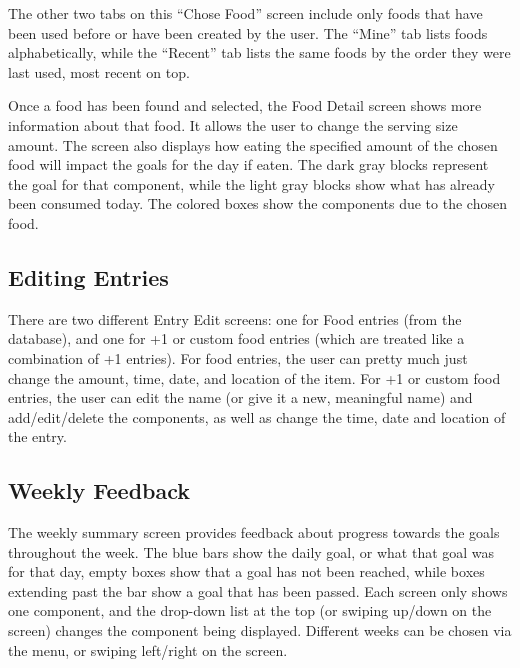 The other two tabs on this ``Chose Food'' screen include only foods that have been used before or have been created by the user. The ``Mine'' tab lists foods alphabetically, while the ``Recent'' tab lists the same foods by the order they were last used, most recent on top. 

Once a food has been found and selected, the Food Detail screen shows more information about that food. It allows the user to change the serving size amount. The screen also displays how eating the specified amount of the chosen food will impact the goals for the day if eaten. The dark gray blocks represent the goal for that component, while the light gray blocks show what has already been consumed today. The colored boxes show the components due to the chosen food. 

\subsection{Editing Entries}

There are two different Entry Edit screens: one for Food entries (from the database), and one for +1 or custom food entries (which are treated like a combination of +1 entries). For food entries, the user can pretty much just change the amount, time, date, and location of the item. For +1 or custom food entries, the user can edit the name (or give it a new, meaningful name) and add/edit/delete the components, as well as change the time, date and location of the entry. 
\subsection{Weekly Feedback}

The weekly summary screen provides feedback about progress towards the goals throughout the week. The blue bars show the daily goal, or what that goal was for that day, empty boxes show that a goal has not been reached, while boxes extending past the bar show a goal that has been passed. Each screen only shows one component, and the drop-down list at the top (or swiping up/down on the screen) changes the component being displayed. Different weeks can be chosen via the menu, or swiping left/right on the screen. 

